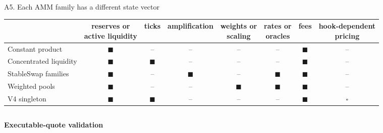 \begin{frame}{A5. Each AMM family has a different state vector}
\begin{center}
\setlength{\tabcolsep}{4.0pt}
\renewcommand{\arraystretch}{1.55}
\scriptsize
\begin{tabular}{@{}p{2.80cm}ccccccc@{}}
\toprule
& \shortstack{reserves or\\active liquidity}
& ticks
& amplification
& \shortstack{weights or\\scaling}
& \shortstack{rates or\\oracles}
& fees
& \shortstack{hook-dependent\\pricing} \\
\midrule
Constant product
& {\color{native}$\blacksquare$} & -- & -- & -- & -- & {\color{native}$\blacksquare$} & -- \\
Concentrated liquidity
& {\color{uclbright}$\blacksquare$} & {\color{uclbright}$\blacksquare$} & -- & -- & -- & {\color{uclbright}$\blacksquare$} & -- \\
StableSwap families
& {\color{stable}$\blacksquare$} & -- & {\color{stable}$\blacksquare$} & -- & {\color{stable}$\blacksquare$} & {\color{stable}$\blacksquare$} & -- \\
Weighted pools
& {\color{imported}$\blacksquare$} & -- & -- & {\color{imported}$\blacksquare$} & {\color{imported}$\blacksquare$} & {\color{imported}$\blacksquare$} & -- \\
V4 singleton
& {\color{accent}$\blacksquare$} & {\color{accent}$\blacksquare$} & -- & -- & -- & {\color{accent}$\blacksquare$} & {\color{accent}$\square$} \\
\bottomrule
\end{tabular}
\end{center}
\vspace{0.18cm}
\begin{columns}[T,totalwidth=0.94\textwidth]
\begin{column}{0.46\textwidth}
{\small\bfseries\color{ucldark} Executable-quote validation\par}

\end{column}
\end{columns}
\end{frame}
